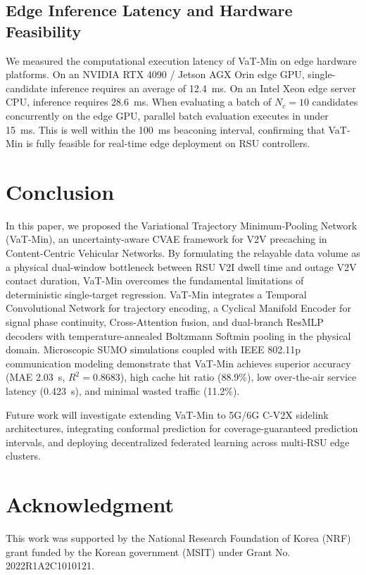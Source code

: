 \documentclass[journal]{IEEEtran}
\begin{document}
\subsection{Edge Inference Latency and Hardware Feasibility}\label{sec:latency}
We measured the computational execution latency of VaT-Min on edge hardware platforms. On an NVIDIA RTX 4090 / Jetson AGX Orin edge GPU, single-candidate inference requires an average of 12.4~ms. On an Intel Xeon edge server CPU, inference requires 28.6~ms. When evaluating a batch of $N_c = 10$ candidates concurrently on the edge GPU, parallel batch evaluation executes in under 15~ms. This is well within the 100~ms beaconing interval, confirming that VaT-Min is fully feasible for real-time edge deployment on RSU controllers.


\section{Conclusion}\label{sec:conclusion}
In this paper, we proposed the Variational Trajectory Minimum-Pooling Network (VaT-Min), an uncertainty-aware CVAE framework for V2V precaching in Content-Centric Vehicular Networks. By formulating the relayable data volume as a physical dual-window bottleneck between RSU V2I dwell time and outage V2V contact duration, VaT-Min overcomes the fundamental limitations of deterministic single-target regression. VaT-Min integrates a Temporal Convolutional Network for trajectory encoding, a Cyclical Manifold Encoder for signal phase continuity, Cross-Attention fusion, and dual-branch ResMLP decoders with temperature-annealed Boltzmann Softmin pooling in the physical domain. Microscopic SUMO simulations coupled with IEEE 802.11p communication modeling demonstrate that VaT-Min achieves superior accuracy (MAE 2.03~s, $R^2 = 0.8683$), high cache hit ratio (88.9\%), low over-the-air service latency (0.423~s), and minimal wasted traffic (11.2\%).

Future work will investigate extending VaT-Min to 5G/6G C-V2X sidelink architectures, integrating conformal prediction for coverage-guaranteed prediction intervals, and deploying decentralized federated learning across multi-RSU edge clusters.


\section*{Acknowledgment}
This work was supported by the National Research Foundation of Korea (NRF) grant funded by the Korean government (MSIT) under Grant No. 2022R1A2C1010121.
\end{document}
